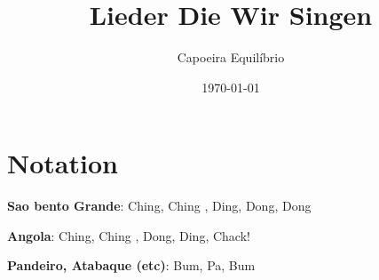 \documentclass[fontsize=14pt, twoside]{scrreprt}
\title{Lieder Die Wir Singen}
\author{Capoeira Equilíbrio}
\date{\today}
\begin{document}
\maketitle
\newpage
\tableofcontents
\chapter*{Notation}
\textbf{Sao bento Grande}: Ching,  Ching , Ding, Dong, Dong

\textbf{Angola}: Ching,  Ching , Dong, Ding, Chack!

\textbf{Pandeiro, Atabaque (etc)}: Bum, Pa, Bum
\newpage

\end{document}
